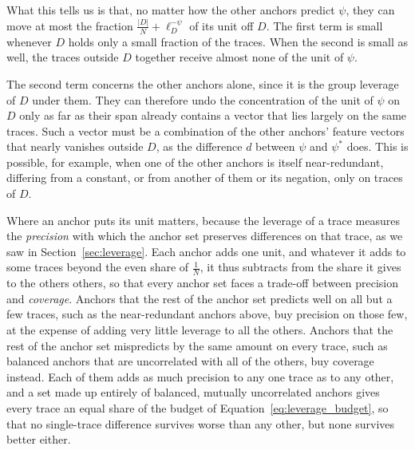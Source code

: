 \documentclass[titlepage,a4paper,11pt]{report}
\begin{document}
    What this tells us is that, no matter how the other anchors predict $\psi$, they can move at most the fraction $\frac{|D|}{N}+\ell_D^{-\psi}$ of its unit off $D$. The first term is small whenever $D$ holds only a small fraction of the traces. When the second is small as well, the traces outside $D$ together receive almost none of the unit of $\psi$.

    The second term concerns the other anchors alone, since it is the group leverage of $D$ under them. They can therefore undo the concentration of the unit of $\psi$ on $D$ only as far as their span already contains a vector that lies largely on the same traces. Such a vector must be a combination of the other anchors' feature vectors that nearly vanishes outside $D$, as the difference $d$ between $\psi$ and $\psi^\ast$ does. This is possible, for example, when one of the other anchors is itself near-redundant, differing from a constant, or from another of them or its negation, only on traces of $D$.

    Where an anchor puts its unit matters, because the leverage of a trace measures the \emph{precision} with which the anchor set preserves differences on that trace, as we saw in Section~\ref{sec:leverage}. Each anchor adds one unit, and whatever it adds to some traces beyond the even share of $\frac1N$, it thus subtracts from the share it gives to the others others, so that every anchor set faces a trade-off between precision and \emph{coverage}. Anchors that the rest of the anchor set predicts well on all but a few traces, such as the near-redundant anchors above, buy precision on those few, at the expense of adding very little leverage to all the others. Anchors that the rest of the anchor set mispredicts by the same amount on every trace, such as balanced anchors that are uncorrelated with all of the others, buy coverage instead. Each of them adds as much precision to any one trace as to any other, and a set made up entirely of balanced, mutually uncorrelated anchors gives every trace an equal share of the budget of Equation~\eqref{eq:leverage_budget}, so that no single-trace difference survives worse than any other, but none survives better either.
\end{document}
